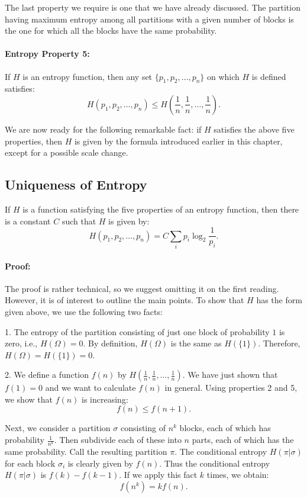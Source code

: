 \documentclass{report}
\begin{document}
The last property we require is one that we have already discussed. The partition having maximum entropy among all partitions with a given number of blocks is the one for which all the blocks have the same probability.

\paragraph{Entropy Property 5:} 
If \( H \) is an entropy function, then any set \( \{p_1, p_2, \ldots, p_n\} \) on which \( H \) is defined satisfies:
\[
H(p_1, p_2, \ldots, p_n) \leq H\left(\frac{1}{n}, \frac{1}{n}, \ldots, \frac{1}{n}\right).
\]

We are now ready for the following remarkable fact: if \( H \) satisfies the above five properties, then \( H \) is given by the formula introduced earlier in this chapter, except for a possible scale change.

\subsection*{Uniqueness of Entropy}
If \( H \) is a function satisfying the five properties of an entropy function, then there is a constant \( C \) such that \( H \) is given by:
\[
H(p_1, p_2, \ldots, p_n) = C \sum_{i} p_i \log_2 \frac{1}{p_i}.
\]

\paragraph{Proof:} 
The proof is rather technical, so we suggest omitting it on the first reading. However, it is of interest to outline the main points. To show that \( H \) has the form given above, we use the following two facts:

1. The entropy of the partition consisting of just one block of probability \( 1 \) is zero, i.e., \( H(\Omega) = 0 \). By definition, \( H(\Omega) \) is the same as \( H(\{1\}) \). Therefore, \( H(\Omega) = H(\{1\}) = 0 \).

2. We define a function \( f(n) \) by \( H\left(\frac{1}{n}, \frac{1}{n}, \ldots, \frac{1}{n}\right) \). We have just shown that \( f(1) = 0 \) and we want to calculate \( f(n) \) in general. Using properties 2 and 5, we show that \( f(n) \) is increasing:
\[
f(n) \leq f(n+1).
\]

Next, we consider a partition \( \sigma \) consisting of \( n^k \) blocks, each of which has probability \( \frac{1}{n^k} \). Then subdivide each of these into \( n \) parts, each of which has the same probability. Call the resulting partition \( \pi \). The conditional entropy \( H(\pi|\sigma) \) for each block \( \sigma_i \) is clearly given by \( f(n) \). Thus the conditional entropy \( H(\pi|\sigma) \) is \( f(k) - f(k-1) \). If we apply this fact \( k \) times, we obtain:
\[
f(n^k) = k f(n).
\]
\end{document}
